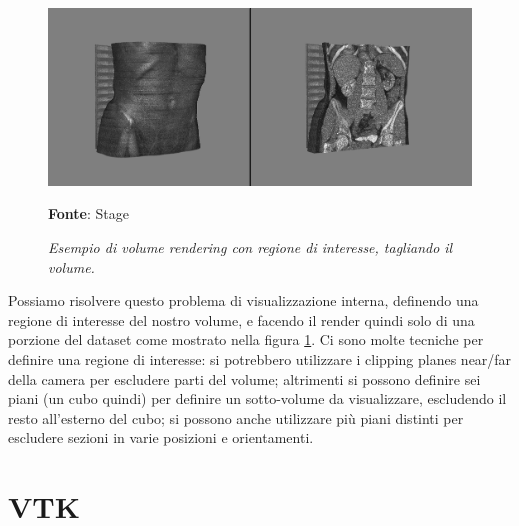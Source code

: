 \begin{figure}[h]
    \centering
    \includegraphics[scale=0.3]{immagini/volumerendering/regionofinterest.png}
    \caption{\textit{Esempio di volume rendering con regione di interesse, tagliando il volume.}}
    \textbf{Fonte}: Stage
    \label{fig: Volume Rendering con Regione di Interesse}
\end{figure}

Possiamo risolvere questo problema di visualizzazione interna, definendo una regione di interesse del nostro volume, e facendo il render quindi solo di una porzione del dataset come mostrato nella figura \ref{fig: Volume Rendering con Regione di Interesse}. Ci sono molte tecniche per definire una regione di interesse: si potrebbero utilizzare i clipping planes near/far della camera per escludere parti del volume; altrimenti si possono definire sei piani (un cubo quindi) per definire un sotto-volume da visualizzare, escludendo il resto all'esterno del cubo; si possono anche utilizzare più piani distinti per escludere sezioni in varie posizioni e orientamenti.

\section{VTK}

